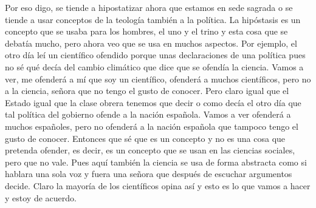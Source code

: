 Por eso digo, se tiende a hipostatizar ahora que estamos en sede sagrada o se tiende a usar conceptos de la teología también a la política. La hipóstasis es un concepto que se usaba para los hombres, el uno y el trino y esta cosa que se debatía mucho, pero ahora veo que se usa en muchos aspectos. Por ejemplo, el otro día leí un científico ofendido porque unas declaraciones de una política pues no sé qué decía del cambio climático que dice que se ofendía la ciencia. Vamos a ver, me ofenderá a mí que soy un científico, ofenderá a muchos científicos, pero no a la ciencia, señora que no tengo el gusto de conocer. Pero claro igual que el Estado igual que la clase obrera tenemos que decir o como decía el otro día que tal política del gobierno ofende a la nación española. Vamos a ver ofenderá a muchos españoles, pero no ofenderá a la nación española que tampoco tengo el gusto de conocer. Entonces que sé que es un concepto y no es una cosa que pretenda ofender, es decir, es un concepto que se usan en las ciencias sociales, pero que no vale. Pues aquí también la ciencia se usa de forma abstracta como si hablara una sola voz y fuera una señora que después de escuchar argumentos decide. Claro la mayoría de los científicos opina así y esto es lo que vamos a hacer y estoy de acuerdo.

